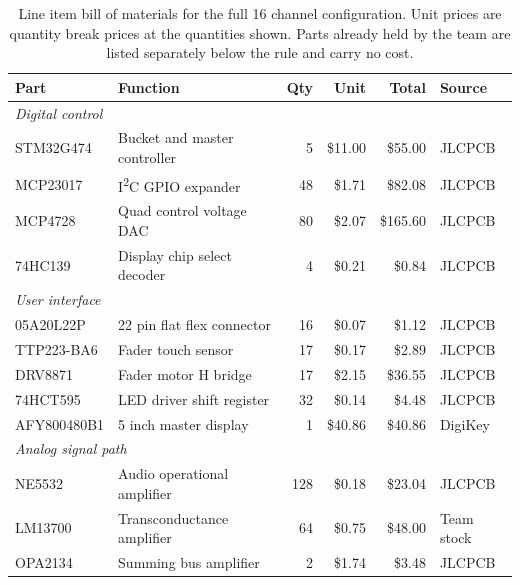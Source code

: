 \documentclass[11pt, letterpaper,titlepage]{article}
\begin{document}
\begin{table}[H]
\centering
\small
\caption{Line item bill of materials for the full 16 channel configuration.
Unit prices are quantity break prices at the quantities shown. Parts already
held by the team are listed separately below the rule and carry no cost.}
\label{tab:bom}
\begin{tabular}{l l r r r l}
\toprule
\textbf{Part} & \textbf{Function} & \textbf{Qty} & \textbf{Unit} & \textbf{Total} & \textbf{Source} \\
\midrule
\multicolumn{6}{l}{\textit{Digital control}} \\
STM32G474      & Bucket and master controller   & 5   & \$11.00 & \$55.00  & JLCPCB \\
MCP23017       & I\textsuperscript{2}C GPIO expander & 48 & \$1.71 & \$82.08 & JLCPCB \\
MCP4728        & Quad control voltage DAC       & 80  & \$2.07  & \$165.60 & JLCPCB \\
74HC139        & Display chip select decoder    & 4   & \$0.21  & \$0.84   & JLCPCB \\
\midrule
\multicolumn{6}{l}{\textit{User interface}} \\
05A20L22P      & 22 pin flat flex connector     & 16  & \$0.07  & \$1.12   & JLCPCB \\
TTP223-BA6     & Fader touch sensor             & 17  & \$0.17  & \$2.89   & JLCPCB \\
DRV8871        & Fader motor H bridge           & 17  & \$2.15  & \$36.55  & JLCPCB \\
74HCT595       & LED driver shift register      & 32  & \$0.14  & \$4.48   & JLCPCB \\
AFY800480B1    & 5 inch master display          & 1   & \$40.86 & \$40.86  & DigiKey \\
\midrule
\multicolumn{6}{l}{\textit{Analog signal path}} \\
NE5532         & Audio operational amplifier    & 128 & \$0.18  & \$23.04  & JLCPCB \\
LM13700        & Transconductance amplifier     & 64  & \$0.75  & \$48.00  & Team stock \\
OPA2134        & Summing bus amplifier          & 2   & \$1.74  & \$3.48   & JLCPCB \\

\end{tabular}
\end{table}
\end{document}
